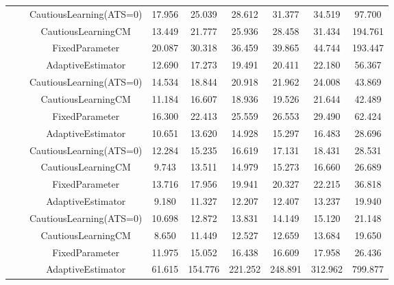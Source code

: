 \begin{table}[!h]
\begin{tabular}[t]{ccccccccc}
 &  & CautiousLearning(ATS=0) & 17.956 & 25.039 & 28.612 & 31.377 & 34.519 & 97.700\\

 &  & CautiousLearningCM & 13.449 & 21.777 & 25.936 & 28.458 & 31.434 & 194.761\\

 & \multirow[t]{-4}{*}{\centering\arraybackslash 0.75} & FixedParameter & 20.087 & 30.318 & 36.459 & 39.865 & 44.744 & 193.447\\
\cmidrule{2-9}
 &  & AdaptiveEstimator & 12.690 & 17.273 & 19.491 & 20.411 & 22.180 & 56.367\\

 &  & CautiousLearning(ATS=0) & 14.534 & 18.844 & 20.918 & 21.962 & 24.008 & 43.869\\

 &  & CautiousLearningCM & 11.184 & 16.607 & 18.936 & 19.526 & 21.644 & 42.489\\

 & \multirow[t]{-4}{*}{\centering\arraybackslash 1.00} & FixedParameter & 16.300 & 22.413 & 25.559 & 26.553 & 29.490 & 62.424\\
\cmidrule{2-9}
 &  & AdaptiveEstimator & 10.651 & 13.620 & 14.928 & 15.297 & 16.483 & 28.696\\

 &  & CautiousLearning(ATS=0) & 12.284 & 15.235 & 16.619 & 17.131 & 18.431 & 28.531\\

 &  & CautiousLearningCM & 9.743 & 13.511 & 14.979 & 15.273 & 16.660 & 26.689\\

 & \multirow[t]{-4}{*}{\centering\arraybackslash 1.25} & FixedParameter & 13.716 & 17.956 & 19.941 & 20.327 & 22.215 & 36.818\\
\cmidrule{2-9}
 &  & AdaptiveEstimator & 9.180 & 11.327 & 12.207 & 12.407 & 13.237 & 19.940\\

 &  & CautiousLearning(ATS=0) & 10.698 & 12.872 & 13.831 & 14.149 & 15.120 & 21.148\\

 &  & CautiousLearningCM & 8.650 & 11.449 & 12.527 & 12.659 & 13.684 & 19.650\\

\multirow[t]{-28}{*}{\centering\arraybackslash 1} & \multirow[t]{-4}{*}{\centering\arraybackslash 1.50} & FixedParameter & 11.975 & 15.052 & 16.438 & 16.609 & 17.958 & 26.436\\
\cmidrule{1-9}
 &  & AdaptiveEstimator & 61.615 & 154.776 & 221.252 & 248.891 & 312.962 & 799.877\\


\end{tabular}
\end{table}
